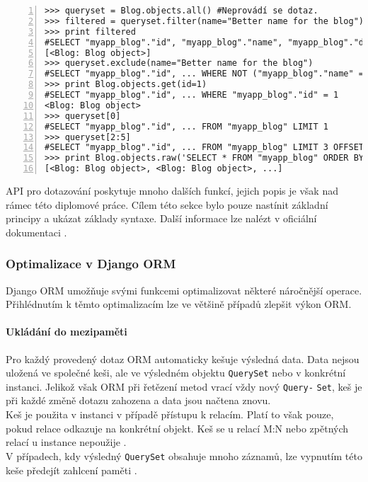 \documentclass[ing,male,java,dept456]{diploma}						%
\begin{document}
\begin{lstlisting}[style=custompython, numbers=left, label=src:Query, caption={Ukázka získávání dat z databáze v Django ORM}]
>>> queryset = Blog.objects.all() #Neprovádí se dotaz.
>>> filtered = queryset.filter(name="Better name for the blog")
>>> print filtered
#SELECT "myapp_blog"."id", "myapp_blog"."name", "myapp_blog"."description" FROM "myapp_blog" WHERE "myapp_blog"."name" = \'Better name for the blog\'
[<Blog: Blog object>] 
>>> queryset.exclude(name="Better name for the blog")
#SELECT "myapp_blog"."id", ... WHERE NOT ("myapp_blog"."name" = \'Better name\' )
>>> print Blog.objects.get(id=1)
#SELECT "myapp_blog"."id", ... WHERE "myapp_blog"."id" = 1
<Blog: Blog object>
>>> queryset[0]
#SELECT "myapp_blog"."id", ... FROM "myapp_blog" LIMIT 1
>>> queryset[2:5]
#SELECT "myapp_blog"."id", ... FROM "myapp_blog" LIMIT 3 OFFSET 2
>>> print Blog.objects.raw('SELECT * FROM "myapp_blog" ORDER BY "myapp_blog"."name"')
[<Blog: Blog object>, <Blog: Blog object>, ...] 
\end{lstlisting}

API pro dotazování poskytuje mnoho dalších funkcí, jejich popis je však nad rámec této diplomové práce. Cílem této sekce bylo pouze nastínit základní principy a ukázat základy syntaxe. Další informace lze nalézt v oficiální dokumentaci \cite{djangodoc}.

\subsubsection{Optimalizace v Django ORM}
\label{subsubsec:DjangoOpt}

Django ORM umožňuje svými funkcemi optimalizovat některé náročnější operace. Přihlédnutím k těmto optimalizacím lze ve většině případů zlepšit výkon ORM. 

\paragraph{Ukládání do mezipaměti}

Pro každý provedený dotaz ORM automaticky kešuje výsledná data. Data nejsou uložená ve společné keši, ale ve výsledném objektu \lstinline[style=inlinepython]|QuerySet| nebo v konkrétní instanci. Jelikož však ORM při řetězení metod vrací vždy nový \lstinline[style=inlinepython]|Query-| \lstinline[style=inlinepython]|Set|, keš je při každé změně dotazu zahozena a data jsou načtena znovu. \\
Keš je použita v instanci v případě přístupu k relacím. Platí to však pouze, pokud relace odkazuje na konkrétní objekt. Keš se u relací M:N nebo zpětných relací u instance nepoužije \cite{dj-queries}. \\
V případech, kdy výsledný \lstinline[style=inlinepython]|QuerySet| obsahuje mnoho záznamů, lze vypnutím této keše předejít zahlcení paměti \cite{dj-querysets}. %
\end{document}
